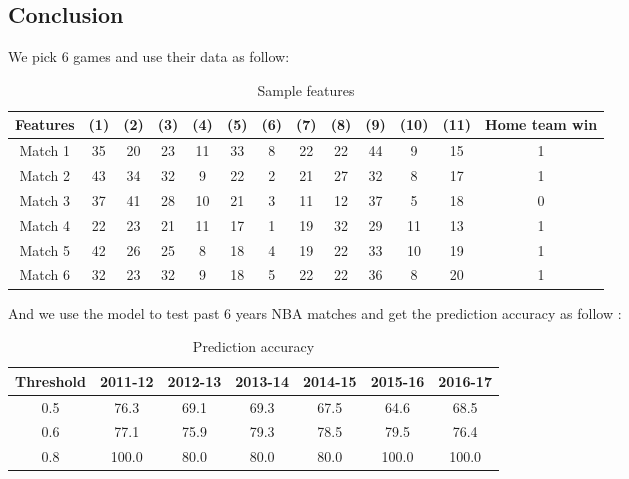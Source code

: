 \documentclass[sigconf]{acmart}
\begin{document}
\subsection{Conclusion}
We pick 6 games and use their data as follow:
\begin{table*}[!hbp]
\begin{tabular}{|c|c|c|c|c|c|c|c|c|c|c|c|c|}
\hline
\hline
Features & (1) & (2) & (3) & (4) & (5) & (6) & (7) & (8) & (9) & (10) & (11) & Home team win \\
\hline
Match 1 & 35 & 20 & 23 & 11 & 33 & 8& 22 & 22 & 44 & 9 & 15 & 1\\
\hline
Match 2 & 43 & 34 & 32 & 9 & 22 & 2 & 21 & 27 & 32 & 8 & 17 & 1\\
\hline
Match 3 & 37 & 41 & 28 & 10 & 21 & 3 & 11 & 12 & 37 & 5 & 18 & 0\\
\hline
Match 4 & 22 & 23 & 21 & 11 & 17 & 1 & 19 & 32 & 29 & 11 & 13 & 1\\
\hline
Match 5 & 42 & 26 & 25 & 8 & 18 & 4 & 19 & 22 & 33 & 10 & 19 & 1\\
\hline
Match 6 & 32 & 23 & 32 & 9 & 18 & 5 & 22 & 22 & 36 & 8 & 20 & 1\\
\hline
\end{tabular}
\caption{Sample features}
\label{Sample features}
\end{table*} 
And we use the model to test past 6 years NBA matches and get the prediction accuracy as follow :
\begin{table*}[htb]
    \centering
    \begin{tabular}{c|c|c|c|c|c|c}
         \hline
         Threshold & 2011-12 & 2012-13 & 2013-14 & 2014-15 & 2015-16 & 2016-17\\
         \hline
         0.5 & 76.3 & 69.1 & 69.3 & 67.5 & 64.6 & 68.5\\
         \hline
         0.6 & 77.1 & 75.9 & 79.3 & 78.5 & 79.5 & 76.4\\
         \hline 
         0.8 & 100.0 & 80.0 & 80.0 & 80.0 & 100.0 & 100.0\\
    \end{tabular}
    \caption{Prediction accuracy}
    \label{Prediction accuracy}
\end{table*}

 
\end{document}

